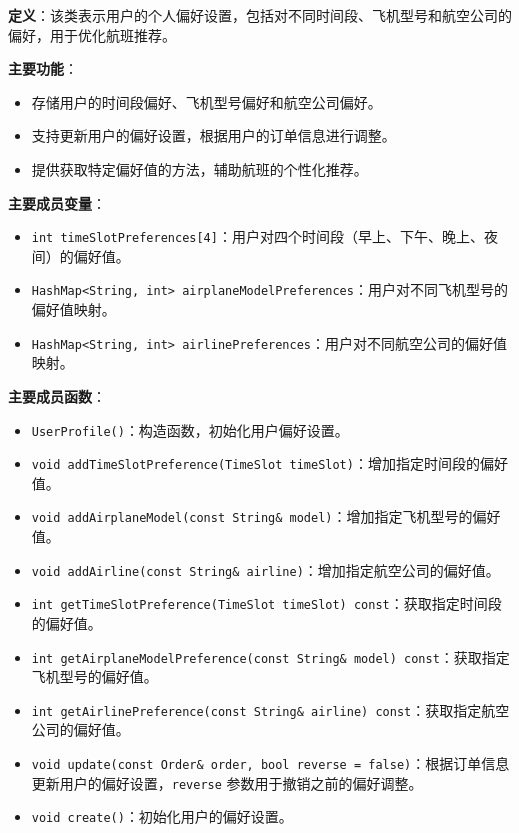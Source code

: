 \documentclass[UTF8, a4paper,12pt]{ctexart}
\begin{document}
\textbf{定义}：该类表示用户的个人偏好设置，包括对不同时间段、飞机型号和航空公司的偏好，用于优化航班推荐。

\textbf{主要功能}：

\begin{itemize}
    \item 存储用户的时间段偏好、飞机型号偏好和航空公司偏好。
    \item 支持更新用户的偏好设置，根据用户的订单信息进行调整。
    \item 提供获取特定偏好值的方法，辅助航班的个性化推荐。
\end{itemize}

\textbf{主要成员变量}：

\begin{itemize}
    \item \texttt{int timeSlotPreferences[4]}：用户对四个时间段（早上、下午、晚上、夜间）的偏好值。
    \item \texttt{HashMap<String, int> airplaneModelPreferences}：用户对不同飞机型号的偏好值映射。
    \item \texttt{HashMap<String, int> airlinePreferences}：用户对不同航空公司的偏好值映射。
\end{itemize}

\textbf{主要成员函数}：

\begin{itemize}
    \item \texttt{UserProfile()}：构造函数，初始化用户偏好设置。
    \item \texttt{void addTimeSlotPreference(TimeSlot timeSlot)}：增加指定时间段的偏好值。
    \item \texttt{void addAirplaneModel(const String\& model)}：增加指定飞机型号的偏好值。
    \item \texttt{void addAirline(const String\& airline)}：增加指定航空公司的偏好值。
    \item \texttt{int getTimeSlotPreference(TimeSlot timeSlot) const}：获取指定时间段的偏好值。
    \item \texttt{int getAirplaneModelPreference(const String\& model) const}：获取指定飞机型号的偏好值。
    \item \texttt{int getAirlinePreference(const String\& airline) const}：获取指定航空公司的偏好值。
    \item \texttt{void update(const Order\& order, bool reverse = false)}：根据订单信息更新用户的偏好设置，\texttt{reverse} 参数用于撤销之前的偏好调整。
    \item \texttt{void create()}：初始化用户的偏好设置。
\end{itemize}
\end{document}
